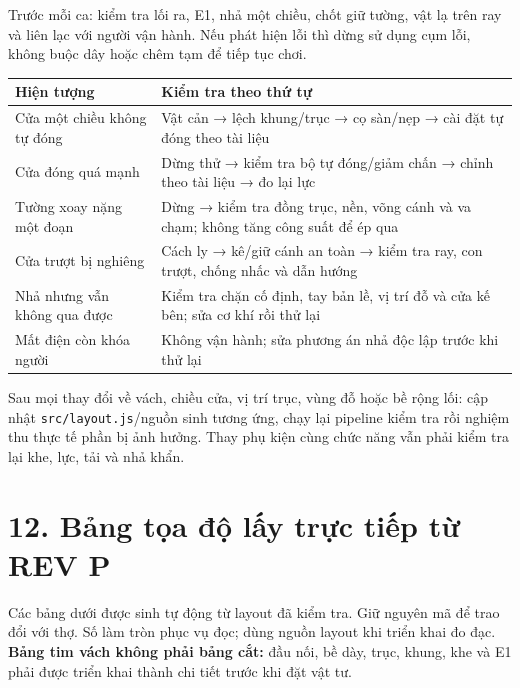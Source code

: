 \documentclass[
  11pt,
  a4paper,
]{article}
\newcounter{none} %
\begin{document}
Trước mỗi ca: kiểm tra lối ra, E1, nhả một chiều, chốt giữ tường, vật lạ
trên ray và liên lạc với người vận hành. Nếu phát hiện lỗi thì dừng sử
dụng cụm lỗi, không buộc dây hoặc chêm tạm để tiếp tục chơi.

{\def\LTcaptype{none} %
\begin{longtable}[]{@{}
  >{\raggedright\arraybackslash}p{}
  >{\raggedright\arraybackslash}p{}@{}}
\toprule\noalign{}
\begin{minipage}[b]{\linewidth}\raggedright
Hiện tượng
\end{minipage} & \begin{minipage}[b]{\linewidth}\raggedright
Kiểm tra theo thứ tự
\end{minipage} \\
\midrule\noalign{}
\endhead
\bottomrule\noalign{}
\endlastfoot
Cửa một chiều không tự đóng & Vật cản → lệch khung/trục → cọ sàn/nẹp →
cài đặt tự đóng theo tài liệu \\
Cửa đóng quá mạnh & Dừng thử → kiểm tra bộ tự đóng/giảm chấn → chỉnh
theo tài liệu → đo lại lực \\
Tường xoay nặng một đoạn & Dừng → kiểm tra đồng trục, nền, võng cánh và
va chạm; không tăng công suất để ép qua \\
Cửa trượt bị nghiêng & Cách ly → kê/giữ cánh an toàn → kiểm tra ray, con
trượt, chống nhấc và dẫn hướng \\
Nhả nhưng vẫn không qua được & Kiểm tra chặn cố định, tay bản lề, vị trí
đỗ và cửa kế bên; sửa cơ khí rồi thử lại \\
Mất điện còn khóa người & Không vận hành; sửa phương án nhả độc lập
trước khi thử lại \\
\end{longtable}
}

Sau mọi thay đổi về vách, chiều cửa, vị trí trục, vùng đỗ hoặc bề rộng
lối: cập nhật \texttt{src/layout.js}/nguồn sinh tương ứng, chạy lại
pipeline kiểm tra rồi nghiệm thu thực tế phần bị ảnh hưởng. Thay phụ
kiện cùng chức năng vẫn phải kiểm tra lại khe, lực, tải và nhả khẩn.

\section{12. Bảng tọa độ lấy trực tiếp từ REV
P}\label{bux1ea3ng-tux1ecda-ux111ux1ed9-lux1ea5y-trux1ef1c-tiux1ebfp-tux1eeb-rev-p}

Các bảng dưới được sinh tự động từ layout đã kiểm tra. Giữ nguyên mã để
trao đổi với thợ. Số làm tròn phục vụ đọc; dùng nguồn layout khi triển
khai đo đạc. \textbf{Bảng tim vách không phải bảng cắt:} đầu nối, bề
dày, trục, khung, khe và E1 phải được triển khai thành chi tiết trước
khi đặt vật tư.
\end{document}
